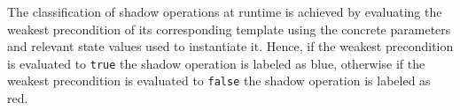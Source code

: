 



The classification of shadow operations at runtime is achieved by evaluating 
the weakest precondition of its corresponding template using the concrete parameters
and relevant state values used to instantiate it. Hence, if the weakest precondition
is evaluated to \texttt{true} the shadow operation is labeled as blue, otherwise if
the weakest precondition is evaluated to \texttt{false} the shadow operation is 
labeled as red.

